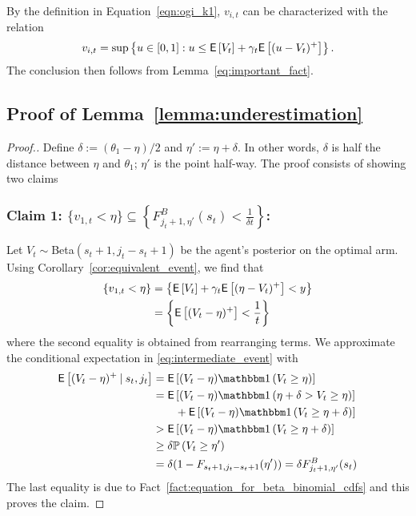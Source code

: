 \begin{myproof}[Proof.]
	By the definition in Equation~\eqref{eqn:ogi_k1}, $v_{i,t}$ can be characterized with the relation 
	\begin{equation*}%
	v_{i,t} = \sup\left\{ u \in [0,1] : u \le \Ee{V_t}  + \gamma_t \Ee{(u - V_t)^+} \right\}.
	\end{equation*}
	The conclusion then follows from Lemma~\ref{eq:important_fact}.
\end{myproof}

\subsection{Proof of Lemma~\ref{lemma:underestimation}} \label{proof:underestimation_proof}
\begin{proof}[Proof.]
	Define $\delta := (\theta_1 - \eta)/2$ and  $\eta' :=  \eta + \delta$. In other words, $\delta$ is half the distance between $\eta$ and $\theta_1$; $\eta'$ is the point half-way. The proof consists of showing two claims
	
	\subsubsection*{Claim 1: $\{v_{1,t} < \eta\} \subseteq \left\{F^B_{j_t+1, \eta'}(s_t) < \frac{1}{\delta t}\right\}$:}
	Let $V_t \sim $Beta$(s_t+1,j_t - s_t + 1)$ be the agent's posterior on the optimal arm. Using Corollary~\ref{cor:equivalent_event}, we find that
	\begin{align}
	\left\{v_{1,t} < \eta \right\} & = \left\{ \mathsf{E} \left[ V_t  \right] + \gamma_t\mathsf{E} \left[ (\eta - V_t)^+ \right] < y \right\} \nonumber\\
	& = \left\{ \mathsf{E} \left[  (V_t - \eta)^+ \right]< \frac{1}{t}  \right\}  \label{eq:intermediate_event}
	\end{align}
	where the second equality is obtained from rearranging terms. We approximate the conditional expectation in \eqref{eq:intermediate_event} with
	\begin{align}
	\Ee{(V_t - \eta)^+ \given s_t, j_t} & = \Ee{(V_t - \eta) \ind{V_t \ge \eta} }\nonumber \\
	& = \Ee{(V_t - \eta) \ind{\eta + \delta > V_t \ge \eta} }  \nonumber \\
	& \qquad + \Ee{(V_t - \eta) \ind{ V_t \ge \eta + \delta} } \nonumber \\
	& > \Ee{(V_t - \eta) \ind{ V_t \ge \eta + \delta} } \nonumber \\
	& \ge \delta\P{ V_t \ge \eta' } \nonumber \\
	& = \delta (1 - F_{s_t+1,j_t-s_t+1}(\eta')) = \delta F^B_{j_t+1,\eta'}(s_t) \label{ineq:lower_bound_on_ppart_term}
	\end{align}
	The last equality is due to Fact~\ref{fact:equation_for_beta_binomial_cdfs} and this proves the claim.

\end{proof}
